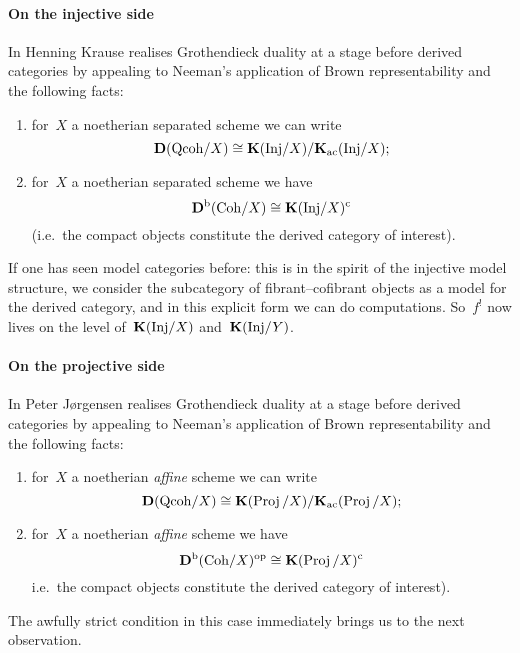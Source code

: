 \documentclass[10pt,a4paper]{article}
\begin{document}
\paragraph{On the injective side}
In \cite[\S 6]{krause-stable-derived-category} Henning Krause realises Grothendieck duality at a stage before derived categories by appealing to Neeman's application of Brown representability and the following facts:
\begin{enumerate}
  \item for~$X$ a noetherian separated scheme we can write
    \begin{equation}
      \mathbf{D}(\mathrm{Qcoh}/X)\cong\mathbf{K}(\mathrm{Inj}/X)/\mathbf{K}_{\mathrm{ac}}(\mathrm{Inj}/X);
    \end{equation}
  \item for~$X$ a noetherian separated scheme we have
    \begin{equation}
      \mathbf{D}^{\mathrm{b}}(\mathrm{Coh}/X)\cong\mathbf{K}(\mathrm{Inj}/X)^{\mathrm{c}}
    \end{equation}
    (i.e.\ the compact objects constitute the derived category of interest).
\end{enumerate}
If one has seen model categories before: this is in the spirit of the injective model structure, we consider the subcategory of fibrant--cofibrant objects as a model for the derived category, and in this explicit form we can do computations. So~$f^!$ now lives on the level of~$\mathbf{K}(\mathrm{Inj}/X)$ and~$\mathbf{K}(\mathrm{Inj}/Y)$.

\paragraph{On the projective side}
In \cite{jorgensen-homotopy-category-projectives} Peter J\o rgensen realises Grothendieck duality at a stage before derived categories by appealing to Neeman's application of Brown representability and the following facts:
\begin{enumerate}
  \item for~$X$ a noetherian \emph{affine} scheme we can write
    \begin{equation}
      \mathbf{D}(\mathrm{Qcoh}/X)\cong\mathbf{K}(\operatorname{Proj}/X)/\mathbf{K}_{\mathrm{ac}}(\operatorname{Proj}/X);
    \end{equation}
  \item for~$X$ a noetherian \emph{affine} scheme we have
    \begin{equation}
      \mathbf{D}^{\mathrm{b}}(\mathrm{Coh}/X)^{\mathrm{op}}\cong\mathbf{K}(\operatorname{Proj}/X)^{\mathrm{c}}
    \end{equation}
    i.e.\ the compact objects constitute the derived category of interest).
\end{enumerate}
The awfully strict condition in this case immediately brings us to the next observation.
\end{document}
